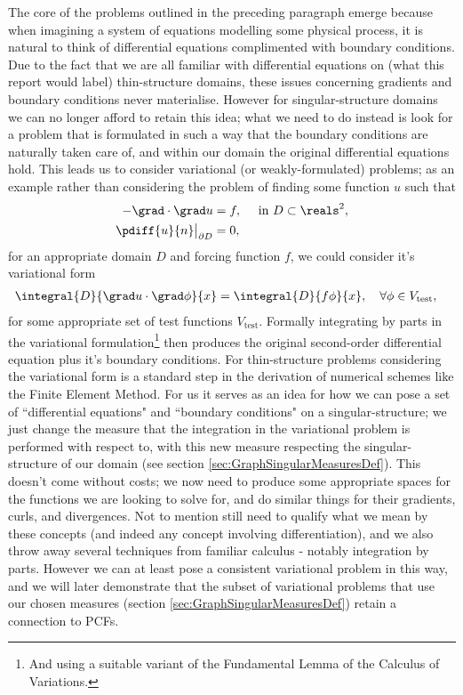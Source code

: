 The core of the problems outlined in the preceding paragraph emerge because when imagining a system of equations modelling some physical process, it is natural to think of differential equations complimented with boundary conditions.
Due to the fact that we are all familiar with differential equations on (what this report would label) thin-structure domains, these issues concerning gradients and boundary conditions never materialise.
However for singular-structure domains we can no longer afford to retain this idea; what we need to do instead is look for a problem that is formulated in such a way that the boundary conditions are naturally taken care of, and within our domain the original differential equations hold.
This leads us to consider variational (or weakly-formulated) problems; as an example rather than considering the problem of finding some function $u$ such that 
\begin{align*}
	-\grad\cdot\grad u &= f, \quad\text{ in } D\subset\reals^2, \\
	\pdiff{u}{n}\big\vert_{\partial D} &= 0,
\end{align*}
for an appropriate domain $D$ and forcing function $f$, we could consider it's variational form
\begin{align*}
	\integral{D}{\grad u \cdot \grad \phi}{x} &= \integral{D}{f\phi}{x}, \quad\forall \phi\in V_{\mathrm{test}},
\end{align*}
for some appropriate set of test functions $V_{\mathrm{test}}$.
Formally integrating by parts in the variational formulation\footnote{And using a suitable variant of the Fundamental Lemma of the Calculus of Variations.} then produces the original second-order differential equation plus it's boundary conditions.
For thin-structure problems considering the variational form is a standard step in the derivation of numerical schemes like the Finite Element Method.
For us it serves as an idea for how we can pose a set of ``differential equations" and ``boundary conditions" on a singular-structure; we just change the measure that the integration in the variational problem is performed with respect to, with this new measure respecting the singular-structure of our domain (see section \ref{sec:GraphSingularMeasuresDef}).
This doesn't come without costs; we now need to produce some appropriate spaces for the functions we are looking to solve for, and do similar things for their gradients, curls, and divergences.
Not to mention still need to qualify what we mean by these concepts (and indeed any concept involving differentiation), and we also throw away several techniques from familiar calculus - notably integration by parts.
However we can at least pose a consistent variational problem in this way, and we will later demonstrate that the subset of variational problems that use our chosen measures (section \ref{sec:GraphSingularMeasuresDef}) retain a connection to PCFs. \newline

